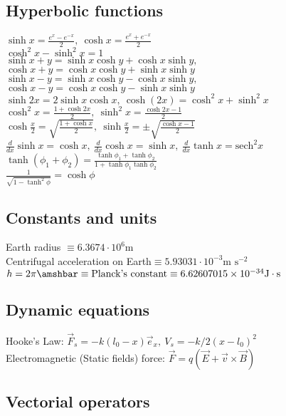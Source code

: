 \subsection{Hyperbolic functions}
$\sinh{x}=\frac{e^{x}-e^{-x}}{2},\ \cosh{x}=\frac{e^{x}+e^{-x}}{2}$\\
$\cosh^{2}{x}-\sinh^{2}{x}=1$\\
$\sinh{x+y}=\sinh{x}\cosh{y}+\cosh{x}\sinh{y},$\\
$\cosh{x+y}=\cosh{x}\cosh{y}+\sinh{x}\sinh{y}$
 \\ $\sinh{x-y}=\sinh{x}\cosh{y}-\cosh{x}\sinh{y},$\\
 $\cosh{x-y}=\cosh{x}\cosh{y}-\sinh{x}\sinh{y}$
 \\ $\sinh{2x}=2\sinh{x}\cosh{x},\ \cosh{(2x)}=\cosh^2{x}+\sinh^2{x}$\\
 $\cosh^2{x}=\frac{1+\cosh{2x}}{2},\ \sinh^2{x}=\frac{\cosh{2x}-1}{2}$
 \\ $\cosh{\frac{x}{2}}=\sqrt{\frac{1+\cosh{x}}{2}},\ \sinh{\frac{x}{2}}=\pm\sqrt{\frac{\cosh{x}-1}{2}}$
 \\ $\frac{d}{dx}\sinh x=\cosh x,\ \frac{d}{dx}\cosh x=\sinh x,\ \frac{d}{dx}\tanh x=\text{sech}^2{x}$\\
$ \tanh{(\phi_{1}+\phi_{2})}=\frac{\tanh{\phi_{1}}+\tanh{\phi_{2}}}{1+\tanh{\phi_{1}}\tanh{\phi_{2}}}$\\
$\frac{1}{\sqrt{1-\tanh^{2}{\phi}}}=\cosh{\phi}$



\subsection{Constants and units}
Earth radius $\equiv6.3674\cdot 10^{6}\text{m}$\\
Centrifugal acceleration on Earth$\equiv 5.93031\cdot 10^{-3}\text{m s}^{-2}$\\
$h=2\pi\amshbar\equiv\text{Planck's constant}\equiv 6.62607015\times 10^{-34}\text{J}\cdot \text{s}$




\subsection{Dynamic equations}
Hooke's Law: $\vec{F}_{s}=-k(l_{0}-x)\vec{e}_{x},\ V_{s}=-k/2(x-l_{0})^{2}$\\
Electromagnetic (Static fields) force: $\vec{F}=q(\vec{E}+\vec{v}\times\vec{B})$




\subsection{Vectorial operators}
